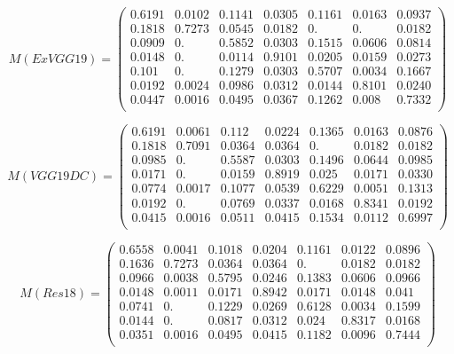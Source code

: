 \documentclass[journal, onecolumn]{IEEEtran}
\begin{document}
\begin{equation}  
\label{eq:conf-VGG19}    
M(ExVGG19)=
\left(                 
  \begin{array}{ccccccc}  
    0.6191&0.0102&0.1141&0.0305&0.1161&0.0163&0.0937\\
    0.1818&0.7273&0.0545&0.0182&0.&0.&0.0182\\
    0.0909&0.&0.5852&0.0303&0.1515&0.0606&0.0814\\
    0.0148&0.&0.0114&0.9101&0.0205&0.0159&0.0273\\
    0.101&0.&0.1279&0.0303&0.5707&0.0034&0.1667\\
    0.0192&0.0024&0.0986&0.0312&0.0144&0.8101&0.0240\\
    0.0447&0.0016&0.0495&0.0367&0.1262&0.008&0.7332\\
  \end{array}
\right)                 
\end{equation}

\begin{equation}
\label{eq:conf-VGG19-DC}
M(VGG19DC)=
\left(
  \begin{array}{ccccccc}
    0.6191&0.0061&0.112&0.0224&0.1365&0.0163&0.0876\\
    0.1818&0.7091&0.0364&0.0364&0.&0.0182&0.0182\\
    0.0985&0.&0.5587&0.0303&0.1496&0.0644&0.0985\\
    0.0171&0.&0.0159&0.8919&0.025&0.0171&0.0330\\
    0.0774&0.0017&0.1077&0.0539&0.6229&0.0051&0.1313\\
    0.0192&0.&0.0769&0.0337&0.0168&0.8341&0.0192\\
    0.0415&0.0016&0.0511&0.0415&0.1534&0.0112&0.6997\\
      \end{array}
\right)
\end{equation}

\begin{equation}
\label{eq:conf-Res18}
M(Res18)=
\left(
  \begin{array}{ccccccc}
    0.6558&0.0041&0.1018&0.0204&0.1161&0.0122&0.0896\\
    0.1636&0.7273&0.0364&0.0364&0.&0.0182&0.0182\\
    0.0966&0.0038&0.5795&0.0246&0.1383&0.0606&0.0966\\
    0.0148&0.0011&0.0171&0.8942&0.0171&0.0148&0.041\\
    0.0741&0.&0.1229&0.0269&0.6128&0.0034&0.1599\\
    0.0144&0.&0.0817&0.0312&0.024&0.8317&0.0168\\
    0.0351&0.0016&0.0495&0.0415&0.1182&0.0096&0.7444\\
      \end{array}
\right)
\end{equation}
\end{document}

